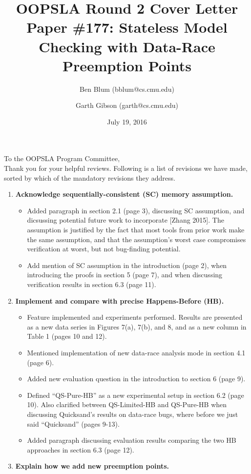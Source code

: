 \documentclass{article}
\title{OOPSLA Round 2 Cover Letter \\ {\normalsize Paper \#177: Stateless Model Checking with Data-Race Preemption Points}}
\author{Ben Blum (\textsf{bblum@cs.cmu.edu}) \and Garth Gibson (\textsf{garth@cs.cmu.edu})}
\date{July 19, 2016}
\begin{document}
\maketitle
\thispagestyle{empty}

\noindent To the OOPSLA Program Committee,
\\

Thank you for your helpful reviews. Following is a list of revisions we have made, sorted by which of the mandatory revisions they address.

\begin{enumerate}
	\item {\bf Acknowledge sequentially-consistent (SC) memory assumption.}
	\begin{itemize}
		\item Added paragraph in section 2.1 (page 3), discussing SC assumption, and dicsussing potential future work to incorporate [Zhang 2015]. The assumption is justified by the fact that most tools from prior work make the same assumption, and that the assumption's worst case compromises verification at worst, but not bug-finding potential.
		\item Add mention of SC assumption in the introduction (page 2),
		when introducing the proofs in section 5 (page 7),
		and when discussing verification results in section 6.3 (page 11).
	\end{itemize}
	\item {\bf Implement and compare with precise Happens-Before (HB).}
	\begin{itemize}
		\item Feature implemented and experiments performed. Results are presented as a new data series in Figures 7(a), 7(b), and 8, and as a new column in Table 1 (pages 10 and 12).
		\item Mentioned implementation of new data-race analysis mode in section 4.1 (page 6).
		\item Added new evaluation question in the introduction to section 6 (page 9).
		\item Defined ``QS-Pure-HB'' as a new experimental setup in section 6.2 (page 10). Also clarified between QS-Limited-HB and QS-Pure-HB when discussing Quicksand's results on data-race bugs, where before we just said ``Quicksand'' (pages 9-13).
		\item Added paragraph discussing evaluation results comparing the two HB approaches in section 6.3 (page 12).
	\end{itemize}
	\item {\bf Explain how we add new preemption points.}

\end{enumerate}
\end{document}
